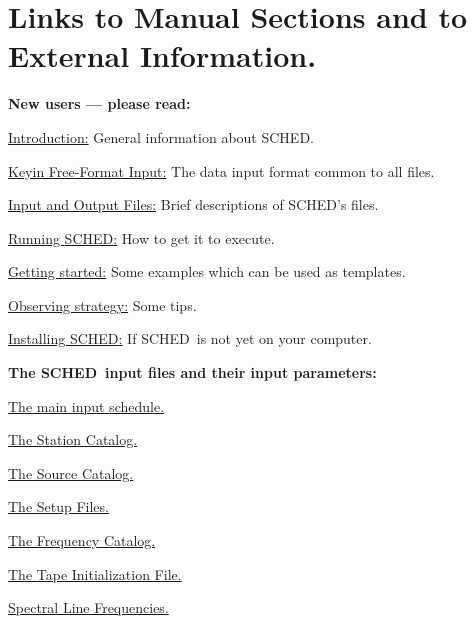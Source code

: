 \documentclass{report}
\newcommand{\sched}{{\sc SCHED}}
\newcommand{\schedb}{{\sc SCHED~}}
\begin{document}
\section{\label{SEC:LINKS}Links to Manual Sections and to
External Information.}

{\bf New users --- please read:}

\begin{list}{}{\parsep 0em  \itemsep 0em }
\item 
{\hyperref[SEC:INTRO]{Introduction:}} General information about \sched.

\item 
{\hyperref[SEC:KEYIN]{Keyin Free-Format Input:}} The data input format
common to all files.

\item 
{\hyperref[SEC:FILES]{Input and Output Files:}} Brief descriptions
of \sched's files.

\item 
{\hyperref[SEC:RUNSCHED]{Running \sched:}} How to get it to execute.

\item 
{\hyperref[SEC:EXAMPLES]{Getting started:}} Some examples which can be
used as templates.

\item 
{\hyperref[SSEC:STRATEGY]{Observing strategy:}} Some tips.

\item 
{\hyperref[SEC:INSTALL]{Installing \sched:}} If \schedb is not yet on your
computer.

\end{list}


{\bf The \sched\ input files and their input parameters:}

\begin{list}{}{\parsep 0em  \itemsep 0em }
\item 
{\hyperref[SEC:SCHPAR]{The main input schedule.}}

\item 
{\hyperref[SEC:STACAT]{The Station Catalog.}}

\item 
{\hyperref[SEC:SRCCAT]{The Source Catalog.}}

\item 
{\hyperref[SEC:SETUPS]{The Setup Files.}}

\item 
{\hyperref[SEC:FRQCAT]{The Frequency Catalog.}}

\item 
{\hyperref[SEC:TPINI]{The Tape Initialization File.}}

\item 
{\hyperref[SEC:LINE]{Spectral Line Frequencies.}}

\end{list}
\end{document}
